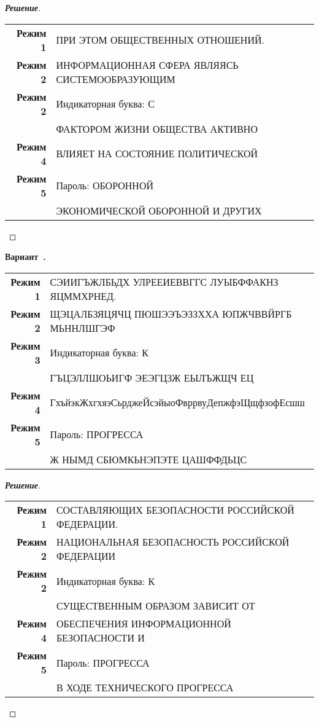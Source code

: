 \documentclass[a4paper,14pt]{extarticle}
\newcounter{exercise}[section]
\newenvironment{exercise}[1][]{\refstepcounter{exercise}\par\medskip
   \noindent\textbf{Вариант~\theexercise. #1}\\
   \noindent\makebox[\linewidth]{\rule{\textwidth}{1.25pt}}
   }
{\vspace{-2.5px}\mbox{}\newline \noindent\makebox[\linewidth]{\rule{\textwidth}{.5pt}}
}
\newenvironment{solution}
{\begin{proof}[\textbf{\textit{Решение}}]}
  {\end{proof}}
\begin{document}
\begin{solution}
\begin{table}[H]
	\centering
	\begin{tabular}{r l}\textbf{Режим 1}  & ПРИ ЭТОМ ОБЩЕСТВЕННЫХ ОТНОШЕНИЙ. \\ 
\textbf{Режим 2}  & ИНФОРМАЦИОННАЯ СФЕРА ЯВЛЯЯСЬ СИСТЕМООБРАЗУЮЩИМ \\ 
\textbf{Режим 2}  & Индикаторная буква: С \\ 
& ФАКТОРОМ ЖИЗНИ ОБЩЕСТВА АКТИВНО \\ 
\textbf{Режим 4}  & ВЛИЯЕТ НА СОСТОЯНИЕ ПОЛИТИЧЕСКОЙ \\ 
\textbf{Режим 5}  & Пароль: ОБОРОННОЙ \\ 
& ЭКОНОМИЧЕСКОЙ ОБОРОННОЙ И ДРУГИХ \\ 
	\end{tabular} 
\end{table}

\end{solution}
\begin{exercise}\begin{table}[H]
	\centering
	\begin{tabular}{r l}\textbf{Режим 1}  & СЭИИГЪЖЛБЬДХ УЛРЕЕИЕВВГГС ЛУЫБФФАКНЗ ЯЦММХРНЕД. \\ 
\textbf{Режим 2}  & ЩЭЦАЛБЗЯЦЯЧЦ ПЮШЭЭЪЭЗЗХХА ЮПЖЧВВЙРГБ МЬННЛШГЭФ \\ 
\textbf{Режим 3}  & Индикаторная буква: К \\ 
& ГЪЦЭЛЛШОЬИГФ ЭЕЭГЦЗЖ ЕЫЛЪЖЩЧ ЕЦ \\ 
\textbf{Режим 4}  & ГхъйэкЖхгхяэСьрджеЙсэйыоФвррвуДепжфэЩщфзофЕсшш \\ 
\textbf{Режим 5}  & Пароль: ПРОГРЕССА \\ 
& Ж НЫМД СБЮМКЬНЭПЭТЕ ЦАШФФДЬЦС \\ 
	\end{tabular} 
\end{table}

\end{exercise}
\begin{solution}
\begin{table}[H]
	\centering
	\begin{tabular}{r l}\textbf{Режим 1}  & СОСТАВЛЯЮЩИХ БЕЗОПАСНОСТИ РОССИЙСКОЙ ФЕДЕРАЦИИ. \\ 
\textbf{Режим 2}  & НАЦИОНАЛЬНАЯ БЕЗОПАСНОСТЬ РОССИЙСКОЙ ФЕДЕРАЦИИ \\ 
\textbf{Режим 2}  & Индикаторная буква: К \\ 
& СУЩЕСТВЕННЫМ ОБРАЗОМ ЗАВИСИТ ОТ \\ 
\textbf{Режим 4}  & ОБЕСПЕЧЕНИЯ ИНФОРМАЦИОННОЙ БЕЗОПАСНОСТИ И \\ 
\textbf{Режим 5}  & Пароль: ПРОГРЕССА \\ 
& В ХОДЕ ТЕХНИЧЕСКОГО ПРОГРЕССА \\ 
	\end{tabular} 
\end{table}

\end{solution}
\end{document}

